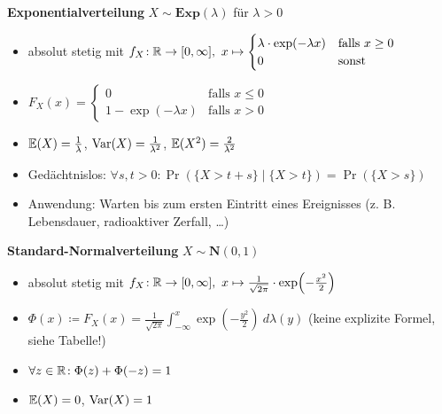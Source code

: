 \newpage
\textbf{Exponentialverteilung} $X\sim\mathbf{Exp}(\lambda)$ für $\lambda > 0$
\begin{itemize}
\item absolut stetig mit
  $f_X\!: \mathbb{R} \to [0,\infty],\ x \mapsto \begin{cases}
  \lambda \cdot \exp(-\lambda x) & \text{falls } x \geq 0	\\
  0                              & \text{sonst }
  \end{cases}$

\item
  $F_X(x) = \begin{cases}
  0                    & \text{falls } x \leq 0  \\
  1 - \exp(-\lambda x) & \text{falls } x > 0
  \end{cases}$

\item $\mathbb{E}(X) = \frac{1}{\lambda}$, $\operatorname{Var}(X) = \frac{1}{\lambda^2}$,
  $\mathbb{E}(X^2) = \frac{2}{\lambda^2}$

\item Gedächtnislos: $\forall s,t>0\!: \Pr(\{X>t+s\} \mid \{X>t\}) = \Pr(\{X>s\})$

\item Anwendung: Warten bis zum ersten Eintritt eines Ereignisses
  (z. B. Lebensdauer, radioaktiver Zerfall, \ldots)
\end{itemize}

\textbf{Standard-Normalverteilung} $X\sim\mathbf{N}(0,1)$
\begin{itemize}
\item absolut stetig mit $f_X\!: \R \to [0,\infty],\
  x \mapsto \frac{1}{\sqrt{2\pi}} \cdot \exp\left(-\frac{x^2}{2}\right)$

\item $\Phi(x) \coloneqq F_X(x)=
  \frac{1}{\sqrt{2\pi}} \int_{-\infty}^{x} \exp\left(-\frac{y^2}{2}\right)~d\lambda(y)$
  (keine explizite Formel, siehe Tabelle!)

\item $\forall z\in\mathbb{R}\!: \Phi(z) + \Phi(-z) = 1$

\item $\mathbb{E}(X) = 0$, $\operatorname{Var}(X) = 1$

\end{itemize}

